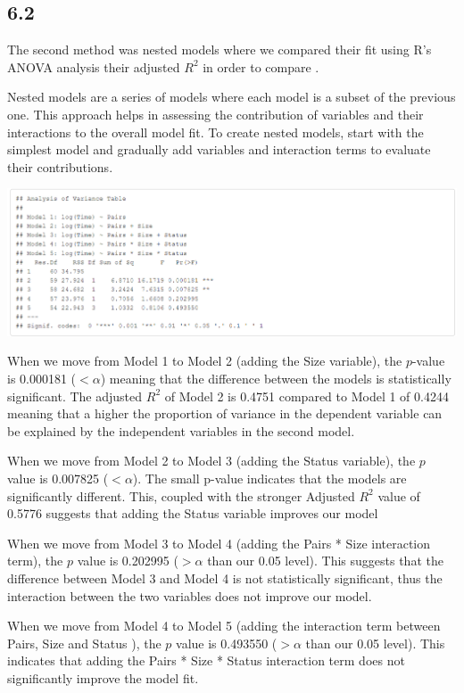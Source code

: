 \documentclass{article}
\begin{document}
\subsection*{6.2}

The second method was nested models where we compared their fit using R's ANOVA analysis their adjusted $R^2$ in order to compare .

Nested models are a series of models where each model is a subset of the previous one. This approach helps in assessing the contribution of variables and their interactions to the overall model fit. To create nested models, start with the simplest model and gradually add variables and interaction terms to evaluate their contributions.


\includegraphics[scale=0.5]{tables/variance-table.png}


When we move from Model 1 to Model 2 (adding the Size variable), the $p$-value is 0.000181 ($< \alpha$) meaning that the difference between the models is statistically significant. The adjusted $R^2$ of Model 2 is 0.4751 compared to Model 1 of 0.4244 meaning that a higher the proportion of variance in the dependent variable can be explained by the independent variables in the second model.

When we move from Model 2 to Model 3 (adding the Status variable), the $p$ value is 0.007825 ($< \alpha$). The small p-value indicates that the models are significantly different. This, coupled with the stronger Adjusted $R^2$ value of 0.5776 suggests that adding the Status variable improves our model

When we move from Model 3 to Model 4 (adding the Pairs * Size interaction term), the $p$ value is 0.202995 ($>\alpha$  than our 0.05 level). This suggests that the difference between Model 3 and Model 4 is not statistically significant, thus the interaction between the two variables does not improve our model.

When we move from Model 4 to Model 5 (adding the interaction term between Pairs,  Size and Status ), the $p$ value is 0.493550 ($>\alpha$  than our 0.05 level). This indicates that adding the Pairs * Size * Status interaction term does not significantly improve the model fit.
\end{document}
